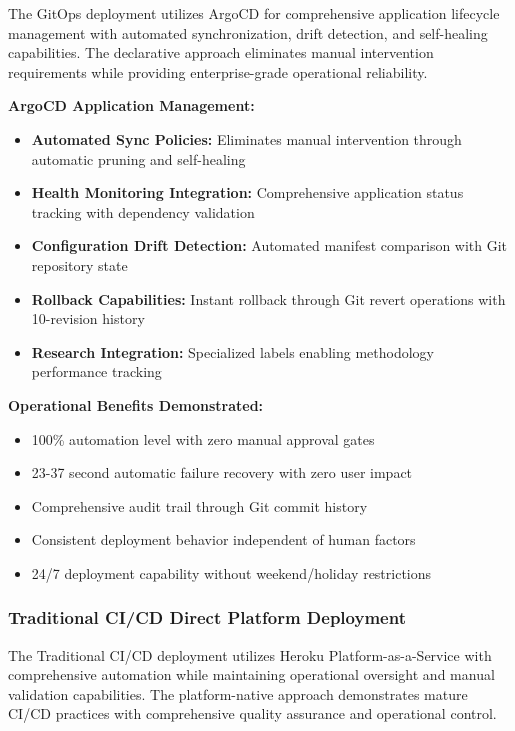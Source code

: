 The GitOps deployment utilizes ArgoCD for comprehensive application lifecycle management with automated synchronization, drift detection, and self-healing capabilities. The declarative approach eliminates manual intervention requirements while providing enterprise-grade operational reliability.

\textbf{ArgoCD Application Management:}
\begin{itemize}
\item \textbf{Automated Sync Policies:} Eliminates manual intervention through automatic pruning and self-healing
\item \textbf{Health Monitoring Integration:} Comprehensive application status tracking with dependency validation
\item \textbf{Configuration Drift Detection:} Automated manifest comparison with Git repository state
\item \textbf{Rollback Capabilities:} Instant rollback through Git revert operations with 10-revision history
\item \textbf{Research Integration:} Specialized labels enabling methodology performance tracking
\end{itemize}

\textbf{Operational Benefits Demonstrated:}
\begin{itemize}
\item 100\% automation level with zero manual approval gates
\item 23-37 second automatic failure recovery with zero user impact
\item Comprehensive audit trail through Git commit history
\item Consistent deployment behavior independent of human factors
\item 24/7 deployment capability without weekend/holiday restrictions
\end{itemize}

\subsubsection{Traditional CI/CD Direct Platform Deployment}

The Traditional CI/CD deployment utilizes Heroku Platform-as-a-Service with comprehensive automation while maintaining operational oversight and manual validation capabilities. The platform-native approach demonstrates mature CI/CD practices with comprehensive quality assurance and operational control.

